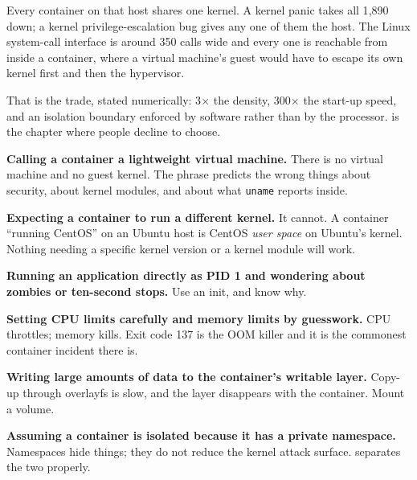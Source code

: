 \begin{alertbox}
Every container on that host shares one kernel. A kernel panic takes all 1{,}890
down; a kernel privilege-escalation bug gives any one of them the host. The
Linux system-call interface is around 350 calls wide and every one is reachable
from inside a container, where a virtual machine's guest would have to escape
its own kernel first and then the hypervisor.

\smallskip
That is the trade, stated numerically: 3$\times$ the density, 300$\times$ the
start-up speed, and an isolation boundary enforced by software rather than by
the processor.  is the chapter where people decline to
choose.
\end{alertbox}

\begin{pitfall}
\begin{tight}
  \item \textbf{Calling a container a lightweight virtual machine.} There is no
        virtual machine and no guest kernel. The phrase predicts the wrong
        things about security, about kernel modules, and about what
        \texttt{uname} reports inside.
  \item \textbf{Expecting a container to run a different kernel.} It cannot. A
        container ``running CentOS'' on an Ubuntu host is CentOS \emph{user
        space} on Ubuntu's kernel. Nothing needing a specific kernel version or
        a kernel module will work.
  \item \textbf{Running an application directly as PID 1 and wondering about
        zombies or ten-second stops.} Use an init, and know why.
  \item \textbf{Setting CPU limits carefully and memory limits by guesswork.}
        CPU throttles; memory kills. Exit code 137 is the OOM killer and it is
        the commonest container incident there is.
  \item \textbf{Writing large amounts of data to the container's writable
        layer.} Copy-up through overlayfs is slow, and the layer disappears
        with the container. Mount a volume.
  \item \textbf{Assuming a container is isolated because it has a private
        namespace.} Namespaces hide things; they do not reduce the kernel
        attack surface.  separates the two properly.
\end{tight}
\end{pitfall}

